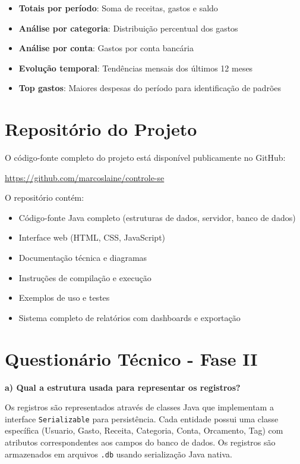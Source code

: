 \documentclass[12pt,a4paper]{article}
\begin{document}
\begin{itemize}
  \item \textbf{Totais por período}: Soma de receitas, gastos e saldo
  \item \textbf{Análise por categoria}: Distribuição percentual dos gastos
  \item \textbf{Análise por conta}: Gastos por conta bancária
  \item \textbf{Evolução temporal}: Tendências mensais dos últimos 12 meses
  \item \textbf{Top gastos}: Maiores despesas do período para identificação de padrões
\end{itemize}

\section{Repositório do Projeto}

O código-fonte completo do projeto está disponível publicamente no GitHub:

\begin{center}
\url{https://github.com/marcoslaine/controle-se}
\end{center}

\noindent O repositório contém:
\begin{itemize}
  \item Código-fonte Java completo (estruturas de dados, servidor, banco de dados)
  \item Interface web (HTML, CSS, JavaScript)
  \item Documentação técnica e diagramas
  \item Instruções de compilação e execução
  \item Exemplos de uso e testes
  \item Sistema completo de relatórios com dashboards e exportação
\end{itemize}

\section*{Questionário Técnico - Fase II}

\textbf{a) Qual a estrutura usada para representar os registros?}

Os registros são representados através de classes Java que implementam a interface \texttt{Serializable} para persistência. Cada entidade possui uma classe específica (Usuario, Gasto, Receita, Categoria, Conta, Orcamento, Tag) com atributos correspondentes aos campos do banco de dados. Os registros são armazenados em arquivos \texttt{.db} usando serialização Java nativa.
\end{document}
